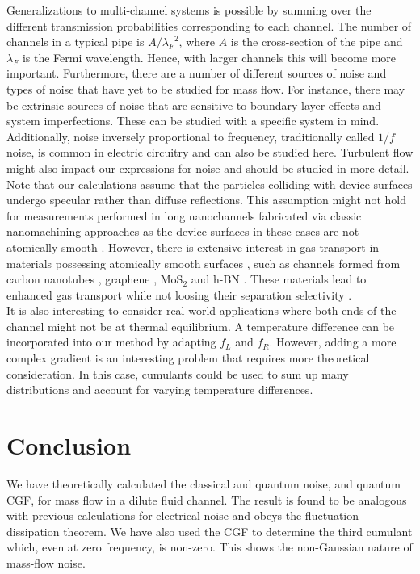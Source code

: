 \documentclass[%
 reprint,
 aps,
 prb,
 epsf,
]{revtex4-2}
\begin{document}
    Generalizations to multi-channel systems is possible by summing over the different transmission probabilities corresponding to each channel. The number of channels in a typical pipe is $A/{\lambda_F}^2$, where $A$ is the cross-section of the pipe and $\lambda_F$ is the Fermi wavelength. Hence, with larger channels this will become more important. Furthermore, there are a number of different sources of noise and types of noise that have yet to be studied for mass flow. For instance, there may be extrinsic sources of noise that are sensitive to boundary layer effects and system imperfections. These can be studied with a specific system in mind. Additionally, noise inversely proportional to frequency, traditionally called $1/f$ noise, is common in electric circuitry and can also be studied here. Turbulent flow might also impact our expressions for noise and should be studied in more detail.\\
    
        Note that our calculations assume that the particles colliding with device surfaces undergo specular rather than diffuse reflections.  This assumption might not hold for measurements performed in long nanochannels fabricated via classic nanomachining approaches as the device surfaces in these cases are not atomically smooth \cite{Qian}.  However, there is extensive interest in gas transport in materials possessing atomically smooth surfaces \cite{wang}, such as channels formed from carbon nanotubes \cite{bakajin}, graphene \cite{Geim}, MoS$_2$ and h-BN \cite{keerthi}. These materials lead to enhanced gas transport while not loosing their separation selectivity \cite{wang}.\\
    
    It is also interesting to consider real world applications where both ends of the channel might not be at thermal equilibrium. A temperature difference can be incorporated into our method by adapting $f_L$ and $f_R$. However, adding a more complex gradient is an interesting problem that requires more theoretical consideration. In this case, cumulants could be used to sum up many distributions and account for varying temperature differences.
    
\section{\label{sec:conclusion}Conclusion}
    We have theoretically calculated the classical and quantum noise, and quantum  CGF, for mass flow in a dilute fluid channel. The result is found to be analogous with previous calculations for electrical noise and obeys the fluctuation dissipation theorem. We have also used the CGF to determine the third cumulant which, even at zero frequency, is non-zero. This shows the non-Gaussian nature of mass-flow noise.\\
    
\end{document}

